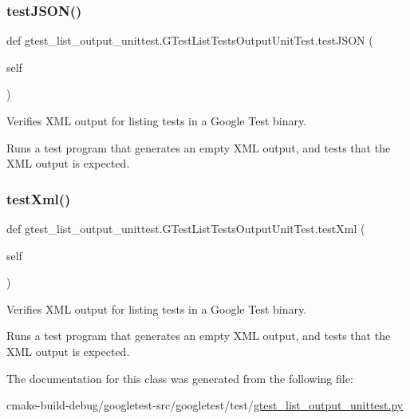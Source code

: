 \subsubsection{\texorpdfstring{testJSON()}{testJSON()}}
{\footnotesize\ttfamily def gtest\+\_\+list\+\_\+output\+\_\+unittest.\+G\+Test\+List\+Tests\+Output\+Unit\+Test.\+test\+J\+S\+ON (\begin{DoxyParamCaption}\item[{}]{self }\end{DoxyParamCaption})}

\begin{DoxyVerb}Verifies XML output for listing tests in a Google Test binary.

Runs a test program that generates an empty XML output, and
tests that the XML output is expected.
\end{DoxyVerb}
 \mbox{\label{classgtest__list__output__unittest_1_1GTestListTestsOutputUnitTest_ad3088bc8ee3a0abdabbf1b90507e272e}} 
\subsubsection{\texorpdfstring{testXml()}{testXml()}}
{\footnotesize\ttfamily def gtest\+\_\+list\+\_\+output\+\_\+unittest.\+G\+Test\+List\+Tests\+Output\+Unit\+Test.\+test\+Xml (\begin{DoxyParamCaption}\item[{}]{self }\end{DoxyParamCaption})}

\begin{DoxyVerb}Verifies XML output for listing tests in a Google Test binary.

Runs a test program that generates an empty XML output, and
tests that the XML output is expected.
\end{DoxyVerb}
 

The documentation for this class was generated from the following file\+:\begin{DoxyCompactItemize}
\item 
cmake-\/build-\/debug/googletest-\/src/googletest/test/\mbox{\hyperlink{gtest__list__output__unittest_8py}{gtest\+\_\+list\+\_\+output\+\_\+unittest.\+py}}\end{DoxyCompactItemize}
